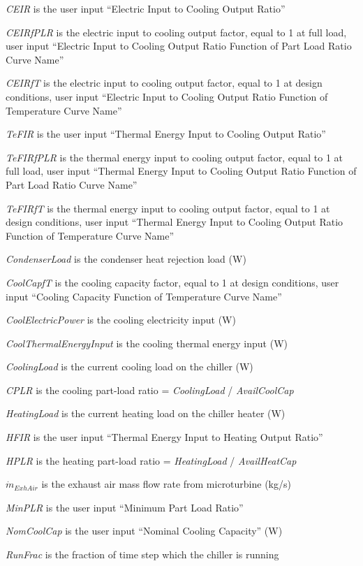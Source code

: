 \emph{CEIR} is the user input ``Electric Input to Cooling Output Ratio''

\emph{CEIRfPLR} is the electric input to cooling output factor, equal to 1 at full load, user input ``Electric Input to Cooling Output Ratio Function of Part Load Ratio Curve Name''

\emph{CEIRfT} is the electric input to cooling output factor, equal to 1 at design conditions, user input ``Electric Input to Cooling Output Ratio Function of Temperature Curve Name''

\emph{TeFIR} is the user input ``Thermal Energy Input to Cooling Output Ratio''

\emph{TeFIRfPLR} is the thermal energy input to cooling output factor, equal to 1 at full load, user input ``Thermal Energy Input to Cooling Output Ratio Function of Part Load Ratio Curve Name''

\emph{TeFIRfT} is the thermal energy input to cooling output factor, equal to 1 at design conditions, user input ``Thermal Energy Input to Cooling Output Ratio Function of Temperature Curve Name''

\emph{CondenserLoad} is the condenser heat rejection load (W)

\emph{CoolCapfT} is the cooling capacity factor, equal to 1 at design conditions, user input ``Cooling Capacity Function of Temperature Curve Name''

\emph{CoolElectricPower} is the cooling electricity input (W)

\emph{CoolThermalEnergyInput} is the cooling thermal energy input (W)

\emph{CoolingLoad} is the current cooling load on the chiller (W)

\emph{CPLR} is the cooling part-load ratio = \emph{CoolingLoad} / \emph{AvailCoolCap}

\emph{HeatingLoad} is the current heating load on the chiller heater (W)

\emph{HFIR} is the user input ``Thermal Energy Input to Heating Output Ratio''

\emph{HPLR} is the heating part-load ratio = \emph{HeatingLoad} / \emph{AvailHeatCap}

\({\dot m_{ExhAir}}\) is the exhaust air mass flow rate from microturbine (kg/s)

\emph{MinPLR} is the user input ``Minimum Part Load Ratio''

\emph{NomCoolCap} is the user input ``Nominal Cooling Capacity'' (W)

\emph{RunFrac} is the fraction of time step which the chiller is running

